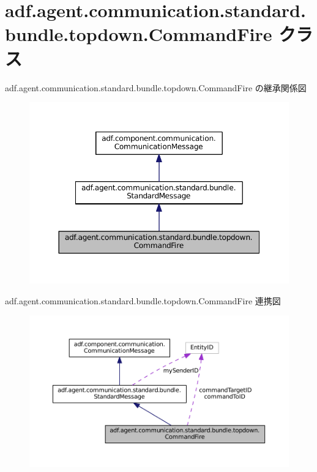 \hypertarget{classadf_1_1agent_1_1communication_1_1standard_1_1bundle_1_1topdown_1_1CommandFire}{}\section{adf.\+agent.\+communication.\+standard.\+bundle.\+topdown.\+Command\+Fire クラス}
\label{classadf_1_1agent_1_1communication_1_1standard_1_1bundle_1_1topdown_1_1CommandFire}


adf.\+agent.\+communication.\+standard.\+bundle.\+topdown.\+Command\+Fire の継承関係図
\nopagebreak
\begin{figure}[H]
\begin{center}
\leavevmode
\includegraphics[width=350pt]{classadf_1_1agent_1_1communication_1_1standard_1_1bundle_1_1topdown_1_1CommandFire__inherit__graph}
\end{center}
\end{figure}


adf.\+agent.\+communication.\+standard.\+bundle.\+topdown.\+Command\+Fire 連携図
\nopagebreak
\begin{figure}[H]
\begin{center}
\leavevmode
\includegraphics[width=350pt]{classadf_1_1agent_1_1communication_1_1standard_1_1bundle_1_1topdown_1_1CommandFire__coll__graph}
\end{center}
\end{figure}
